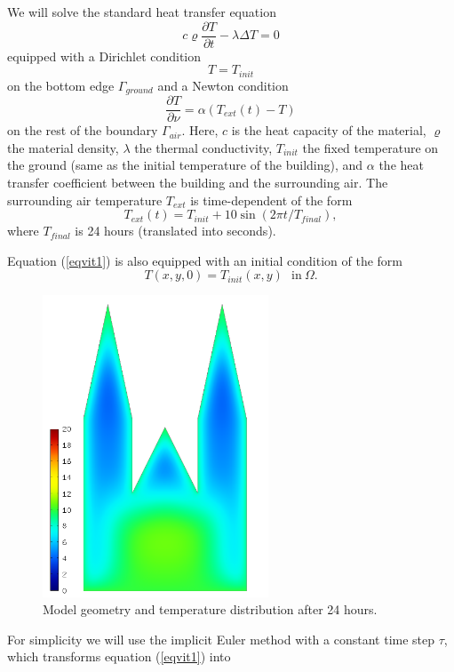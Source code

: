 \documentclass[11pt]{article}
\begin{document}
We will solve the standard heat transfer equation
\begin{equation} \label{eqvit1}
c \varrho\frac{\partial T}{\partial t} - \lambda \Delta T = 0
\end{equation}
equipped with a Dirichlet condition
$$
T = T_{init}
$$
on the bottom edge $\Gamma_{ground}$ and a Newton condition
$$
\frac{\partial T}{\partial \nu} = \alpha(T_{ext}(t) - T)
$$
on the rest of the boundary $\Gamma_{air}$. Here, $c$ is the heat capacity of the material,
$\varrho$ the material density, $\lambda$ the thermal conductivity,
$T_{init}$ the fixed temperature on the
ground (same as the initial temperature of the building), and $\alpha$
the heat transfer coefficient 
between the building and the surrounding air. The surrounding air temperature
$T_{ext}$ is time-dependent of the form
$$
T_{ext}(t) = T_{init} + 10\sin(2\pi t/T_{final}),
$$
where $T_{final}$ is 24 hours (translated into seconds).

Equation (\ref{eqvit1}) is also equipped with an initial condition of the
form
$$
T(x,y,0) = T_{init}(x,y) \ \ \ \mbox{in} \ \Omega.
$$

\begin{figure}[!ht]
  \medskip \centering
  \includegraphics[width=0.6\textwidth]{img/vitus1.png}
  \caption{Model geometry and temperature distribution after 24 hours.}
  \label{fig:vitus}
\end{figure}

For simplicity we will use the implicit Euler method with a constant
time step $\tau$, which transforms equation (\ref{eqvit1}) into
\end{document}
